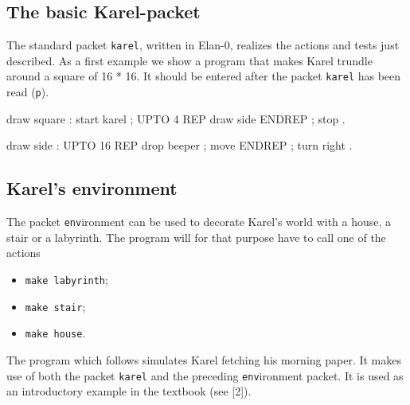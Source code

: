 \subsection{The basic Karel-packet}

The standard packet {\tt karel}, written in Elan-0,
realizes the actions and tests just described.
As a first example we show a program that makes Karel trundle
around a square of 16 * 16. It should be entered after
the packet {\tt karel} has been read ({\tt p}).

\begin{elan}
draw square :
  start karel ;
  UPTO 4
  REP draw side
  ENDREP ;
  stop .

draw side :
  UPTO 16
  REP drop beeper ;
      move
  ENDREP ;
  turn right .
\end{elan}

\subsection{Karel's environment}

The packet {\tt env}ironment can be used to decorate
Karel's world with a house, a stair or a labyrinth. The program
will for that purpose have to call one of the actions

\begin{itemize}
\item	{\tt make labyrinth};
\item	{\tt make stair};
\item	{\tt make house}.
\end{itemize}

\noindent
The program which follows simulates Karel fetching his morning paper.
It makes use of both the packet {\tt karel} and the preceding {\tt env}ironment
packet. It is used as an introductory example in the textbook (see [2]).

